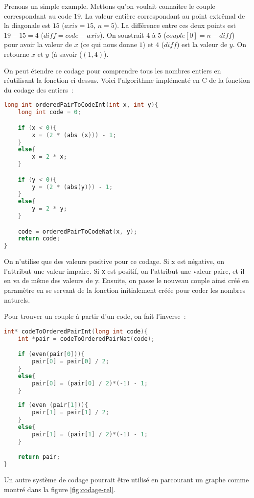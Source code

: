\documentclass{article}
\begin{document}
Prenons un simple example. Mettons qu'on voulait connaitre le couple correspondant au code $19$. La valeur entière  correspondant au point extrêmal de la diagonale est $15$ ($axis = 15$, $n = 5$). La différence entre ces deux points est $19 - 15 = 4$ ($diff = code - axis$). On soustrait $4$ à $5$ ($couple[0] = n - diff$) pour avoir la valeur de $x$ (ce qui nous donne $1$) et $4$ ($diff$) est la valeur de $y$. On retourne $x$ et $y$ (à savoir ($(1,4)$).

On peut étendre ce codage pour comprendre tous les nombres entiers en réutilisant la fonction ci-dessus. Voici l'algorithme implémenté en C de la fonction du codage des entiers~:

\begin{lstlisting}[language=C]
long int orderedPairToCodeInt(int x, int y){
	long int code = 0;	

	if (x < 0){
		x = (2 * (abs (x))) - 1;
	}
	else{
		x = 2 * x;
	}

	if (y < 0){
		y = (2 * (abs(y))) - 1;
	}
	else{
		y = 2 * y;
	}

	code = orderedPairToCodeNat(x, y);
	return code;
}
\end{lstlisting}


On n'utilise que des valeurs positive pour ce codage. Si x est négative, on l'attribut une valeur impaire. Si \lstinline!x! est positif, on
l'attribut une valeur paire, et il en va de même des valeurs de y. Ensuite, on passe le nouveau couple ainsi créé en paramètre en se servant
de la fonction initialement créée pour coder les nombres naturels.


Pour trouver un couple à partir d'un code, on fait l'inverse~:

\begin{lstlisting}[language=C]
int* codeToOrderedPairInt(long int code){
	int *pair = codeToOrderedPairNat(code);

	if (even(pair[0])){
		pair[0] = pair[0] / 2;
	}
	else{
		pair[0] = (pair[0] / 2)*(-1) - 1;
	} 
	
	if (even (pair[1])){
		pair[1] = pair[1] / 2;
	}
	else{
		pair[1] = (pair[1] / 2)*(-1) - 1;
	}

	return pair;
}
\end{lstlisting}  


Un autre système de codage pourrait être utilisé en parcourant un graphe comme montré dans la figure \ref{fig:codage-rel}.
\end{document}
